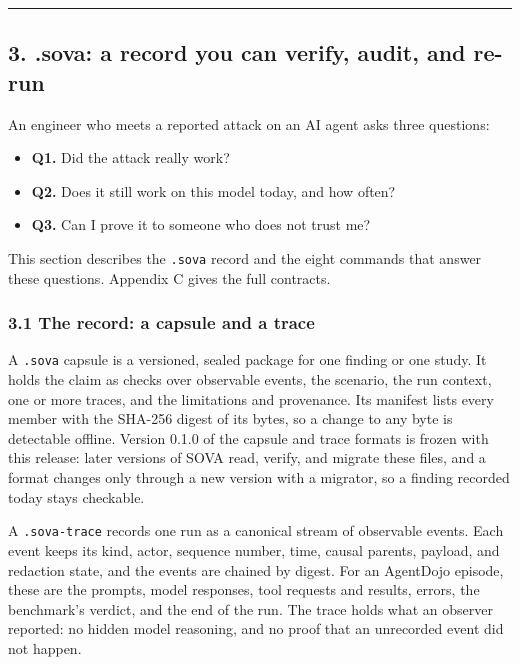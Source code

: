 \documentclass[
  american,
  10pt,
  a4paper,
]{article}
\providecommand{\tightlist}{%
  \setlength{\itemsep}{0pt}\setlength{\parskip}{0pt}}
\begin{document}
\begin{center}\rule{0.5\linewidth}{0.5pt}\end{center}

\subsection{3. .sova: a record you can verify, audit, and
re-run}\label{sova-a-record-you-can-verify-audit-and-re-run}

An engineer who meets a reported attack on an AI agent asks three
questions:

\begin{itemize}
\tightlist
\item
  \textbf{Q1.} Did the attack really work?
\item
  \textbf{Q2.} Does it still work on this model today, and how often?
\item
  \textbf{Q3.} Can I prove it to someone who does not trust me?
\end{itemize}

This section describes the \texttt{.sova} record and the eight commands
that answer these questions. Appendix C gives the full contracts.

\subsubsection{3.1 The record: a capsule and a
trace}\label{the-record-a-capsule-and-a-trace}

A \texttt{.sova} capsule is a versioned, sealed package for one finding
or one study. It holds the claim as checks over observable events, the
scenario, the run context, one or more traces, and the limitations and
provenance. Its manifest lists every member with the SHA-256 digest of
its bytes, so a change to any byte is detectable offline. Version 0.1.0
of the capsule and trace formats is frozen with this release: later
versions of SOVA read, verify, and migrate these files, and a format
changes only through a new version with a migrator, so a finding
recorded today stays checkable.

A \texttt{.sova-trace} records one run as a canonical stream of
observable events. Each event keeps its kind, actor, sequence number,
time, causal parents, payload, and redaction state, and the events are
chained by digest. For an AgentDojo episode, these are the prompts,
model responses, tool requests and results, errors, the benchmark's
verdict, and the end of the run. The trace holds what an observer
reported: no hidden model reasoning, and no proof that an unrecorded
event did not happen.
\end{document}
